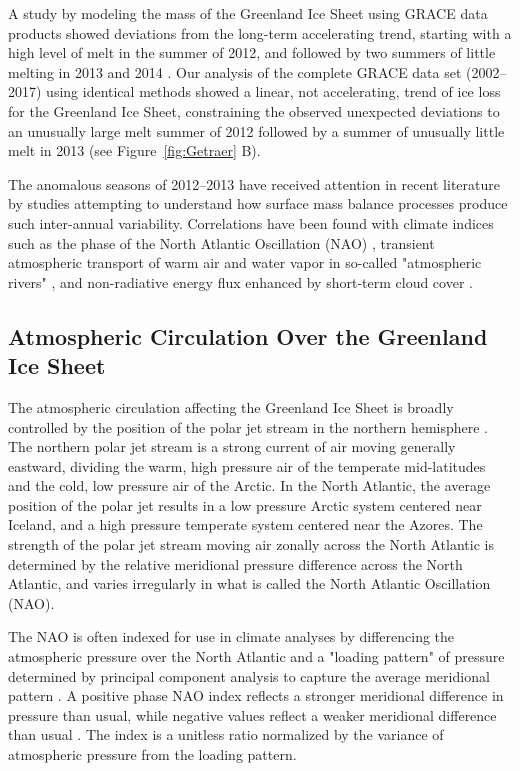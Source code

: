 \documentclass[11pt]{report}
\begin{document}
A study by \cite{Harig+2016} modeling the mass of the Greenland Ice Sheet
using GRACE data products showed deviations from the long-term accelerating
trend, starting with a high level of melt in the summer of 2012, and followed by two
summers of little melting in 2013 and 2014 \cite[see
Figure~\ref{fig:Getraer} A, comparable to][their
Figure~4]{Harig+2016}. Our analysis of the complete GRACE data set (2002--2017) using identical methods showed a linear,
not accelerating, trend of ice loss for the Greenland Ice Sheet, constraining the observed unexpected deviations to an unusually large melt summer of 2012 followed by a summer of unusually little melt in 2013 (see
Figure~\ref{fig:Getraer} B). 


The anomalous seasons of 2012--2013 have received attention in recent literature by studies attempting to understand how surface mass balance processes produce such inter-annual variability. Correlations have been found with climate indices such as the phase of the North Atlantic Oscillation (NAO) \cite[][]{mcmillan2016,bevis2019,getraerFall}, transient atmospheric transport of warm air and water vapor in so-called "atmospheric rivers" \citep{mattingly2018}, and non-radiative energy flux enhanced by short-term cloud cover \citep{solomon2017}. 




\subsection{Atmospheric Circulation Over the Greenland Ice Sheet}
The atmospheric circulation affecting the Greenland Ice Sheet is broadly controlled by the position of the polar jet stream in the northern hemisphere \cite[][]{hanna2013,mattingly2018}. The northern polar jet stream is a strong current of air moving generally eastward, dividing the warm, high pressure air of the temperate mid-latitudes and the cold, low pressure air of the Arctic. In the North Atlantic, the average position of the polar jet results in a low pressure Arctic system centered near Iceland, and a high pressure temperate system centered near the Azores. The strength of the polar jet stream moving air zonally across the North Atlantic is determined by the relative meridional pressure difference across the North Atlantic, and varies irregularly in what is called the North Atlantic Oscillation (NAO).

The NAO is often indexed for use in climate analyses by differencing the atmospheric pressure over the North Atlantic and a "loading pattern" of pressure determined by principal component analysis to capture the average meridional pattern \cite[][]{hurrelNAO,cpcNAO}. A positive phase NAO index reflects a stronger meridional difference in pressure than usual, while negative values reflect a weaker meridional difference than usual \cite[][]{hurrelNAO}. The index is a unitless ratio normalized by the variance of atmospheric pressure from the loading pattern.
\end{document}
